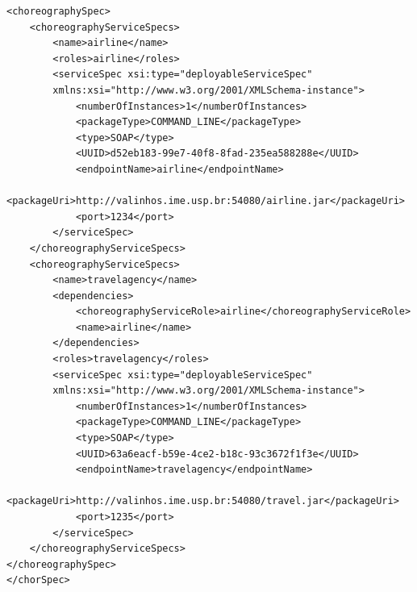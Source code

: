 \documentclass[a4paper, 10pt]{article}
\begin{document}
{\footnotesize

\lstset{language=XML}

\begin{lstlisting}[caption=ChorSpec XML representation example, label=lst:chor_spec_xml]
<choreographySpec>
    <choreographyServiceSpecs>
        <name>airline</name>
        <roles>airline</roles>
        <serviceSpec xsi:type="deployableServiceSpec" 
        xmlns:xsi="http://www.w3.org/2001/XMLSchema-instance">
            <numberOfInstances>1</numberOfInstances>
            <packageType>COMMAND_LINE</packageType>
            <type>SOAP</type>
            <UUID>d52eb183-99e7-40f8-8fad-235ea588288e</UUID>
            <endpointName>airline</endpointName>
            <packageUri>http://valinhos.ime.usp.br:54080/airline.jar</packageUri>
            <port>1234</port>
        </serviceSpec>
    </choreographyServiceSpecs>
    <choreographyServiceSpecs>
        <name>travelagency</name>
        <dependencies>
            <choreographyServiceRole>airline</choreographyServiceRole>
            <name>airline</name>
        </dependencies>
        <roles>travelagency</roles>
        <serviceSpec xsi:type="deployableServiceSpec" 
        xmlns:xsi="http://www.w3.org/2001/XMLSchema-instance">
            <numberOfInstances>1</numberOfInstances>
            <packageType>COMMAND_LINE</packageType>
            <type>SOAP</type>
            <UUID>63a6eacf-b59e-4ce2-b18c-93c3672f1f3e</UUID>
            <endpointName>travelagency</endpointName>
            <packageUri>http://valinhos.ime.usp.br:54080/travel.jar</packageUri>
            <port>1235</port>
        </serviceSpec>
    </choreographyServiceSpecs>
</choreographySpec>
</chorSpec>\end{lstlisting}

}
\end{document}
